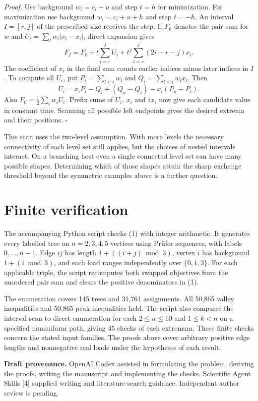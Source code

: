 \documentclass[11pt]{article}
\begin{document}
\textit{Proof.} Use background $w_i=c_i+u$ and step $t=h$ for minimization. For maximization use background $w_i=c_i+u+h$ and step $t=-h$. An interval $I=[r,j]$ of the prescribed size receives the step. If $F_0$ denotes the pair sum for $w$ and $U_i=\sum_l w_l|x_l-x_i|$, direct expansion gives
\[
 F_I=F_0+t\sum_{i=r}^j U_i+t^2\sum_{i=r}^j(2i-r-j)x_i .
\]
The coefficient of $x_i$ in the final sum counts earlier indices minus later indices in $I$. To compute all $U_i$, put $P_i=\sum_{l\le i}w_l$ and $Q_i=\sum_{l\le i}w_lx_l$. Then
\[
 U_i=x_i P_i-Q_i+(Q_n-Q_i)-x_i(P_n-P_i).
\]
Also $F_0=\tfrac12\sum_i w_i U_i$. Prefix sums of $U_i$, $x_i$ and $ix_i$ now give each candidate value in constant time. Scanning all possible left endpoints gives the desired extrema and their positions. $\square$

This scan uses the two-level assumption. With more levels the necessary connectivity of each level set still applies, but the choices of nested intervals interact. On a branching host even a single connected level set can have many possible shapes. Determining which of those shapes attain the sharp exchange threshold beyond the symmetric examples above is a further question.
\section{Finite verification}
The accompanying Python script checks (1) with integer arithmetic. It generates every labelled tree on $n=2,3,4,5$ vertices using Pr\"ufer sequences, with labels $0,\ldots,n-1$. Edge $ij$ has length $1+((i+j)\bmod 3)$, vertex $i$ has background $1+(i\bmod 3)$, and each load ranges independently over $\{0,1,3\}$. For each applicable triple, the script recomputes both swapped objectives from the unordered pair sum and clears the positive denominators in (1).

The enumeration covers 145 trees and 31,761 assignments. All 50,865 valley inequalities and 50,865 peak inequalities held. The script also compares the interval scan to direct enumeration for each $2\le n\le10$ and $1\le k<n$ on a specified nonuniform path, giving 45 checks of each extremum. These finite checks concern the stated input families. The proofs above cover arbitrary positive edge lengths and nonnegative real loads under the hypotheses of each result.

\textbf{Draft provenance.} OpenAI Codex assisted in formulating the problem, deriving the proofs, writing the manuscript and implementing the checks. Scientific Agent Skills [4] supplied writing and literature-search guidance. Independent author review is pending.
\end{document}
